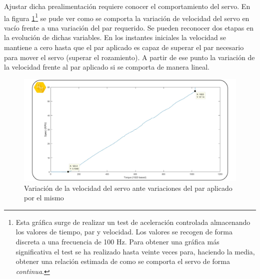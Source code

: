 Ajustar dicha prealimentación requiere conocer el comportamiento del servo. En la figura \ref{fig:Control:control_velocidad_par_1}\footnote{Esta gráfica surge de realizar un test de aceleración controlada almacenando los valores de tiempo, par y velocidad. Los valores se recogen de forma discreta a una frecuencia de 100 Hz. Para obtener una gráfica más significativa el test se ha realizado hasta veinte veces para, haciendo la media, obtener una relación estimada de como se comporta el servo de forma \textit{continua}.} se pude ver como se comporta la variación de velocidad del servo en vacío frente a una variación del par requerido. Se pueden reconocer dos etapas en la evolución de dichas variables. En los instantes iniciales la velocidad se mantiene a cero hasta que el par aplicado es capaz de superar el par necesario para mover el servo (superar el rozamiento). A partir de ese punto la variación de la velocidad frente al par aplicado si se comporta de manera lineal.

\begin{figure}
    \centering
    \includegraphics[width=1\textwidth]{figuras/Imagenes_Control/Control_1.jpg}
    \caption{Variación de la velocidad del servo ante variaciones del par aplicado por el mismo}
    \label{fig:Control:control_velocidad_par_1}
\end{figure}

